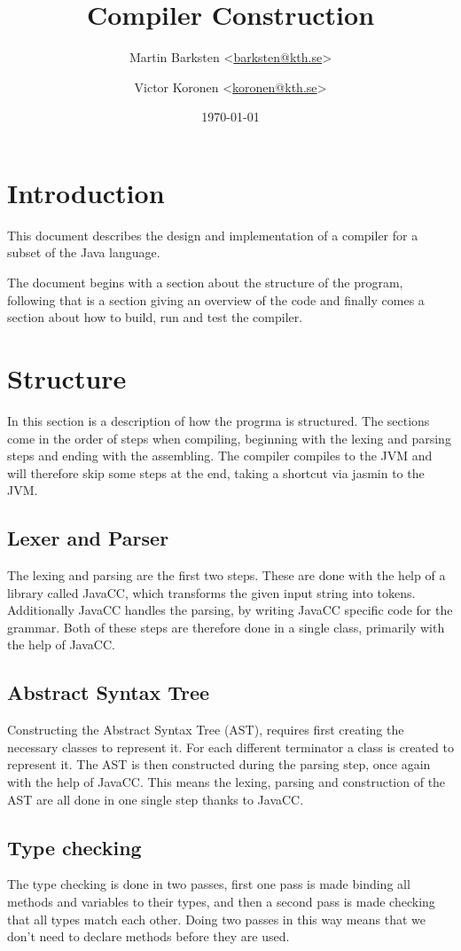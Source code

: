 \documentclass[a4paper]{article}
\title{Compiler Construction}
\author{%
    Martin Barksten <\href{mailto:barksten@kth.se}{barksten@kth.se}> \and
    Victor Koronen <\href{mailto:koronen@kth.se}{koronen@kth.se}>
}
\date{\today}
\begin{document}
\maketitle
\thispagestyle{empty}

\section{Introduction}
This document describes the design and implementation of a compiler for a subset of the Java language.

The document begins with a section about the structure of the program, following that is a section giving an overview of the code and finally comes a section about how to build, run and test the compiler.

\section{Structure}
In this section is a description of how the progrma is structured. The sections come in the order of steps when compiling, beginning with the lexing and parsing steps and ending with the assembling. The compiler compiles to the JVM and will therefore skip some steps at the end, taking a shortcut via jasmin to the JVM.

\subsection{Lexer and Parser}
The lexing and parsing are the first two steps. These are done with the help of a library called JavaCC, which transforms the given input string into tokens. Additionally JavaCC handles the parsing, by writing JavaCC specific code for the grammar. Both of these steps are therefore done in a single class, primarily with the help of JavaCC.

\subsection{Abstract Syntax Tree}
Constructing the Abstract Syntax Tree (AST), requires first creating the necessary classes to represent it. For each different terminator a class is created to represent it. The AST is then constructed during the parsing step, once again with the help of JavaCC. This means the lexing, parsing and construction of the AST are all done in one single step thanks to JavaCC.

\subsection{Type checking}
The type checking is done in two passes, first one pass is made binding all methods and variables to their types, and then a second pass is made checking that all types match each other. Doing two passes in this way means that we don't need to declare methods before they are used.
\end{document}

